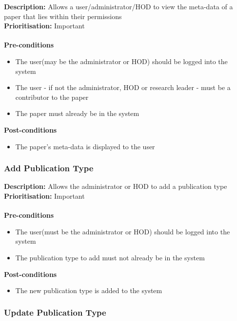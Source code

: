 \documentclass[a4paper]{article}
\begin{document}
    \textbf{Description:} Allows a user/administrator/HOD to view the meta-data of a paper that lies within their permissions\\
    \textbf{Prioritisation:} Important\\
    \\
    
    \textbf{Pre-conditions}
     \begin{itemize}
        \item The user(may be the administrator or HOD) should be logged into the system
        \item The user - if not the administrator, HOD or research leader - must be a contributor to the paper
        \item The paper must already be in the system
   \end{itemize}
    
    \textbf{Post-conditions}
    \begin{itemize}
        \item The paper's meta-data is displayed to the user
    \end{itemize}
\pagebreak

    \subsubsection{Add Publication Type}

    \textbf{Description:} Allows the administrator or HOD to add a publication type \\
        \textbf{Prioritisation:} Important\\
        \\
        
        
    \textbf{Pre-conditions}
     \begin{itemize}
        \item The user(must be the administrator or HOD) should be logged into the system
        \item The publication type to add must not already be in the system
   \end{itemize}
    
    \textbf{Post-conditions}
    \begin{itemize}
        \item The new publication type is added to the system
    \end{itemize}
    
    \subsubsection{Update Publication Type}
    
\end{document}
